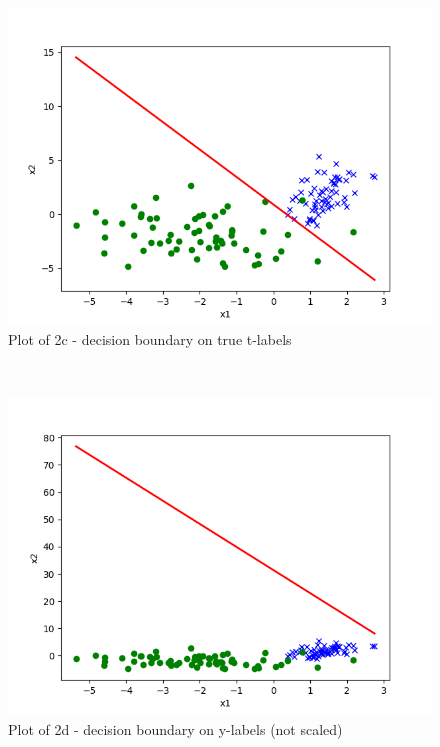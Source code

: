 \begin{answer}\\
\begin{figure}
  \includegraphics[width=\linewidth]{p02c_pred_test.png}
  \caption{Plot of 2c - decision boundary on true t-labels}
  \label{fig:Plot of 2c - decision boundary on true t-labels}
\end{figure}\\
\begin{figure}
  \includegraphics[width=\linewidth]{p02d_pred_test.png}
  \caption{Plot of 2d - decision boundary on y-labels (not scaled)}
  \label{fig:Plot of 2d - decision boundary on y-labels (not scaled)}
\end{figure}\\

\end{answer}

